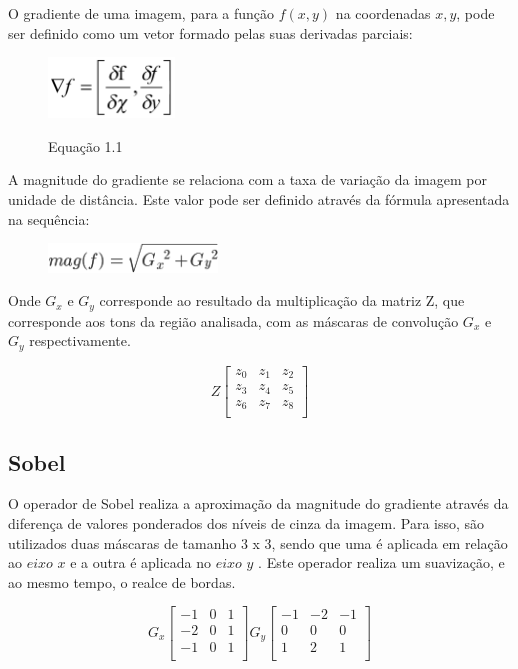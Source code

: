 \documentclass[
	12pt,				%
	oneside,			%
	a4paper,			%
	english,			%
	french,				%
	spanish,			%
	brazil,				%
	]{abntex2}
\begin{document}
O gradiente de uma imagem, para a função \(f(x,y)\) na coordenadas \(x,y\), pode ser definido como um vetor formado pelas suas derivadas parciais:

\begin{figure}[ht]
\centering
\includegraphics[width=0.3\textwidth]{imagens/gradiente.png}

Equação 1.1
\end{figure}

A magnitude do gradiente se relaciona com a taxa de variação da imagem por unidade de distância. Este valor pode ser definido através da fórmula apresentada na sequência:

\begin{figure}[ht]
\centering
\includegraphics[width=0.4\textwidth]{imagens/magnitude.png}
\end{figure}


Onde \(G_x\) e \(G_y\) corresponde ao resultado da multiplicação da matriz Z, que corresponde aos tons da região analisada, com as máscaras de convolução \(G_x\) e \(G_y\) respectivamente.


\[
Z
\begin{bmatrix}
    z_0 & z_1 & z_2    \\
	z_3 & z_4 & z_5    \\  
	z_6 & z_7 & z_8    \\  
\end{bmatrix} 
\]

\subsection{Sobel}

O operador de Sobel realiza a aproximação da magnitude do gradiente através da diferença de valores ponderados dos níveis de cinza da imagem. Para isso, são utilizados duas máscaras de tamanho 3 x 3, sendo que uma é aplicada em relação ao \(eixo\) \(x\) e a outra é aplicada no \(eixo\) \(y\) \cite{pedriniSchwartz:2008}. Este operador realiza um suavização, e ao mesmo tempo, o realce de bordas.

\[
G_x
\begin{bmatrix}
    -1 & 0 & 1   \\ 
	-2 & 0 & 1   \\ 
	-1 & 0 & 1   \\ 
\end{bmatrix} 
G_y
\begin{bmatrix}
    -1 & -2 & -1   \\ 
	 0 &  0 & 0    \\ 
	 1 &  2 & 1    \\    
\end{bmatrix} 
\]
\end{document}
